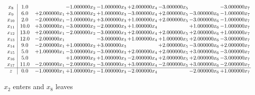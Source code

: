 \documentclass[10pt]{article}
\begin{document}
\[\begin{array}{c| c c@{\hskip 2pt} c@{\hskip 2pt} c@{\hskip 2pt} c@{\hskip 2pt} c@{\hskip 2pt} c@{\hskip 2pt} c@{\hskip 2pt} }
 x_{8}   &  1.0  &   & -1.000000 x_{2} & -1.000000 x_{3} & + 2.000000 x_{4} & -3.000000 x_{5} &   & -3.000000 x_{7}\\
 x_{9}   &  6.0 & + 2.000000 x_{1} & + 3.000000 x_{2} & + 1.000000 x_{3} & -3.000000 x_{4} & + 2.000000 x_{5} & -3.000000 x_{6} & -1.000000 x_{7}\\
 x_{10}   &  2.0 & -2.000000 x_{1} & -1.000000 x_{2} & + 3.000000 x_{3} & + 1.000000 x_{4} & + 2.000000 x_{5} & -3.000000 x_{6} & -1.000000 x_{7}\\
 x_{11}   &  10.0 & + 3.000000 x_{1} & -3.000000 x_{2} & -2.000000 x_{3} & + 1.000000 x_{4} &   & + 1.000000 x_{6} & -1.000000 x_{7}\\
 x_{12}   &  13.0 & + 2.000000 x_{1} & -2.000000 x_{2} & -3.000000 x_{3} & + 2.000000 x_{4} & + 2.000000 x_{5} & + 2.000000 x_{6} & + 1.000000 x_{7}\\
 x_{13}   &  12.0 & -2.000000 x_{1} &   & -3.000000 x_{3} & + 1.000000 x_{4} & + 1.000000 x_{5} & + 2.000000 x_{6} & -3.000000 x_{7}\\
 x_{14}   &  9.0 & -2.000000 x_{1} & + 1.000000 x_{2} & + 3.000000 x_{3} &   & + 2.000000 x_{5} & -3.000000 x_{6} & + 2.000000 x_{7}\\
 x_{15}   &  5.0 & + 1.000000 x_{1} & -3.000000 x_{2} & -3.000000 x_{3} & + 2.000000 x_{4} & + 2.000000 x_{5} & + 3.000000 x_{6} & -3.000000 x_{7}\\
 x_{16}   &  5.0  &   & + 1.000000 x_{2} & + 1.000000 x_{3} & -2.000000 x_{4} & + 2.000000 x_{5} & + 2.000000 x_{6} & -3.000000 x_{7}\\
 x_{17}   &  11.0 & -2.000000 x_{1} & -2.000000 x_{2} & -3.000000 x_{3} & + 3.000000 x_{4} & -2.000000 x_{5} & + 3.000000 x_{6} & -2.000000 x_{7}\\
\hline
z    &  0.0 & -1.000000 x_{1} & + 1.000000 x_{2} & -1.000000 x_{3} & -2.000000 x_{4} &   & -2.000000 x_{6} & + 1.000000 x_{7}\\
\end{array}\]


 $ x_{2} $ enters and $ x_{8} $ leaves 
\end{document}
